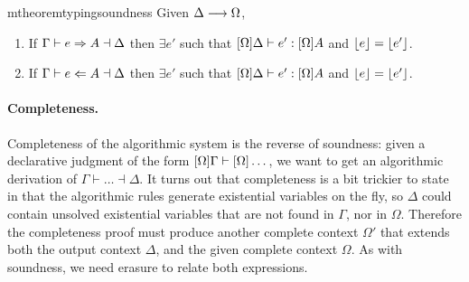 



\begin{restatable}{mtheorem}{typingsoundness} \label{thm:type_sound}
  Given $\Delta \longrightarrow \Omega$,

  \begin{enumerate}
  \item If $\Gamma \vdash e \Rightarrow A \dashv \Delta$ then $\exists e'$ such
    that $[\Omega]\Delta \vdash e' : [\Omega]A$ and
    $\lfloor{e}\rfloor = \lfloor{e'}\rfloor$.
  \item If $\Gamma \vdash e \Leftarrow A \dashv \Delta$ then $\exists e'$ such
    that $[\Omega]\Delta \vdash e' : [\Omega]A$ and
    $\lfloor{e}\rfloor = \lfloor{e'}\rfloor$.
  \end{enumerate}


\end{restatable}


\paragraph{Completeness.}
Completeness of the algorithmic system is the reverse of soundness: given a
declarative judgment of the form $[\Omega]\Gamma \vdash
[\Omega]\dots $, we want to get an algorithmic derivation of $\Gamma
\vdash \dots \dashv \Delta$. It turns out that completeness is a bit trickier to
state in that the algorithmic rules generate existential variables on the fly,
so $\Delta$ could contain unsolved existential variables that are not found in
$\Gamma$, nor in $\Omega$. Therefore the completeness proof must produce another
complete context $\Omega'$ that extends both the output context $\Delta$, and
the given complete context $\Omega$. As with soundness, we need erasure to
relate both expressions.

